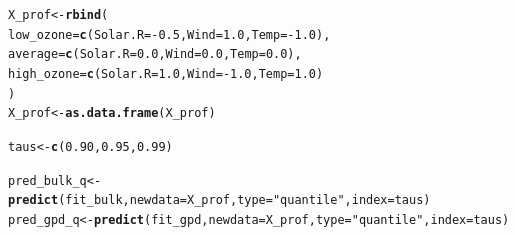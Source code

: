 \documentclass[article]{jss}\usepackage[]{graphicx}\usepackage[]{xcolor}
\makeatletter
\newcommand{\hlnum}[1]{\textcolor[rgb]{0.686,0.059,0.569}{#1}}%
\newcommand{\hlsng}[1]{\textcolor[rgb]{0.192,0.494,0.8}{#1}}%
\newcommand{\hlopt}[1]{\textcolor[rgb]{0,0,0}{#1}}%
\newcommand{\hldef}[1]{\textcolor[rgb]{0.345,0.345,0.345}{#1}}%
\newcommand{\hlkwb}[1]{\textcolor[rgb]{0.69,0.353,0.396}{#1}}%
\newcommand{\hlkwc}[1]{\textcolor[rgb]{0.333,0.667,0.333}{#1}}%
\newcommand{\hlkwd}[1]{\textcolor[rgb]{0.737,0.353,0.396}{\textbf{#1}}}%
\newenvironment{kframe}{%
 \def\at@end@of@kframe{}%
 \ifinner\ifhmode%
  \def\at@end@of@kframe{\end{minipage}}%
  \begin{minipage}{\columnwidth}%
 \fi\fi%
 \def\FrameCommand##1{\hskip\@totalleftmargin \hskip-\fboxsep
 \colorbox{shadecolor}{##1}\hskip-\fboxsep
     \hskip-\linewidth \hskip-\@totalleftmargin \hskip\columnwidth}%
 \MakeFramed {\advance\hsize-\width
   \@totalleftmargin\z@ \linewidth\hsize
   \@setminipage}}%
 {\par\unskip\endMakeFramed%
 \at@end@of@kframe}
\newenvironment{knitrout}{}{} %
\makeatother
\begin{document}
\begin{knitrout}
\color{fgcolor}\begin{kframe}
\begin{alltt}
\hldef{X_prof} \hlkwb{<-} \hlkwd{rbind}\hldef{(}
  \hlkwc{low_ozone}   \hldef{=} \hlkwd{c}\hldef{(}\hlkwc{Solar.R} \hldef{=} \hlopt{-}\hlnum{0.5}\hldef{,} \hlkwc{Wind} \hldef{=}  \hlnum{1.0}\hldef{,} \hlkwc{Temp} \hldef{=} \hlopt{-}\hlnum{1.0}\hldef{),}
  \hlkwc{average}    \hldef{=} \hlkwd{c}\hldef{(}\hlkwc{Solar.R} \hldef{=}  \hlnum{0.0}\hldef{,} \hlkwc{Wind} \hldef{=}  \hlnum{0.0}\hldef{,} \hlkwc{Temp} \hldef{=}  \hlnum{0.0}\hldef{),}
  \hlkwc{high_ozone}  \hldef{=} \hlkwd{c}\hldef{(}\hlkwc{Solar.R} \hldef{=}  \hlnum{1.0}\hldef{,} \hlkwc{Wind} \hldef{=} \hlopt{-}\hlnum{1.0}\hldef{,} \hlkwc{Temp} \hldef{=}  \hlnum{1.0}\hldef{)}
\hldef{)}
\hldef{X_prof} \hlkwb{<-} \hlkwd{as.data.frame}\hldef{(X_prof)}

\hldef{taus} \hlkwb{<-} \hlkwd{c}\hldef{(}\hlnum{0.90}\hldef{,} \hlnum{0.95}\hldef{,} \hlnum{0.99}\hldef{)}

\hldef{pred_bulk_q} \hlkwb{<-} \hlkwd{predict}\hldef{(fit_bulk,} \hlkwc{newdata} \hldef{= X_prof,} \hlkwc{type} \hldef{=} \hlsng{"quantile"}\hldef{,} \hlkwc{index} \hldef{= taus)}
\hldef{pred_gpd_q}  \hlkwb{<-} \hlkwd{predict}\hldef{(fit_gpd,}  \hlkwc{newdata} \hldef{= X_prof,} \hlkwc{type} \hldef{=} \hlsng{"quantile"}\hldef{,} \hlkwc{index} \hldef{= taus)}


\end{alltt}
\end{kframe}
\end{knitrout}
\end{document}
